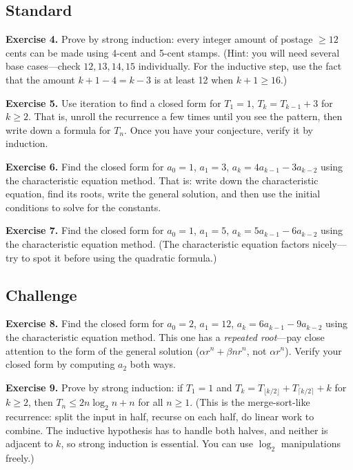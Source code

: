 \documentclass[11pt]{article}
\begin{document}
\subsection*{Standard}

\textbf{Exercise 4.}\label{ex:m9:4} Prove by strong induction: every integer amount of postage $\geq 12$ cents can be made using 4-cent and 5-cent stamps. (Hint: you will need several base cases---check $12, 13, 14, 15$ individually. For the inductive step, use the fact that the amount $k+1-4 = k-3$ is at least 12 when $k+1 \geq 16$.)

\bigskip
\textbf{Exercise 5.}\label{ex:m9:5} Use iteration to find a closed form for $T_1 = 1$, $T_k = T_{k-1} + 3$ for $k \geq 2$. That is, unroll the recurrence a few times until you see the pattern, then write down a formula for $T_n$. Once you have your conjecture, verify it by induction.

\bigskip
\textbf{Exercise 6.}\label{ex:m9:6} Find the closed form for $a_0 = 1$, $a_1 = 3$, $a_k = 4 a_{k-1} - 3 a_{k-2}$ using the characteristic equation method. That is: write down the characteristic equation, find its roots, write the general solution, and then use the initial conditions to solve for the constants.

\bigskip
\textbf{Exercise 7.}\label{ex:m9:7} Find the closed form for $a_0 = 1$, $a_1 = 5$, $a_k = 5 a_{k-1} - 6 a_{k-2}$ using the characteristic equation method. (The characteristic equation factors nicely---try to spot it before using the quadratic formula.)

\subsection*{Challenge}

\textbf{Exercise 8.}\label{ex:m9:8} Find the closed form for $a_0 = 2$, $a_1 = 12$, $a_k = 6 a_{k-1} - 9 a_{k-2}$ using the characteristic equation method. This one has a \emph{repeated root}---pay close attention to the form of the general solution ($\alpha r^n + \beta n r^n$, not $\alpha r^n$). Verify your closed form by computing $a_2$ both ways.

\bigskip
\textbf{Exercise 9.}\label{ex:m9:9} Prove by strong induction: if $T_1 = 1$ and $T_k = T_{\lfloor k/2 \rfloor} + T_{\lceil k/2 \rceil} + k$ for $k \geq 2$, then $T_n \leq 2n \log_2 n + n$ for all $n \geq 1$. (This is the merge-sort-like recurrence: split the input in half, recurse on each half, do linear work to combine. The inductive hypothesis has to handle both halves, and neither is adjacent to $k$, so strong induction is essential. You can use $\log_2$ manipulations freely.)
\end{document}
